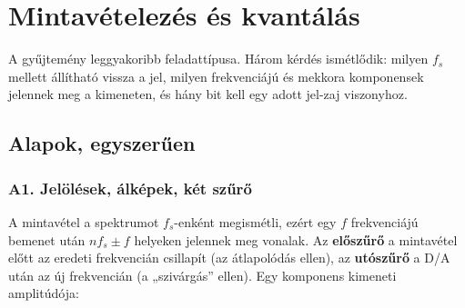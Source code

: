 \setcounter{chapter}{1}
\chapter{\texorpdfstring{Mintavételezés és kvantálás}{Mintavételezés és kvantálás}}\label{f2}
A gyűjtemény leggyakoribb feladattípusa. Három kérdés ismétlődik: milyen $f_s$ mellett állítható vissza a jel, milyen frekvenciájú és mekkora komponensek jelennek meg a kimeneten, és hány bit kell egy adott jel-zaj viszonyhoz.

\section{Alapok, egyszerűen}
\subsection{\texorpdfstring{A1. Jelölések, álképek, két szűrő}{A1. Jelölések, álképek, két szűrő}}\label{a2-tetel}
\par{}\par

A mintavétel a spektrumot $f_s$-enként megismétli, ezért egy $f$ frekvenciájú bemenet után $nf_s\pm f$ helyeken jelennek meg vonalak. Az \textbf{előszűrő} a mintavétel előtt az eredeti frekvencián csillapít (az átlapolódás ellen), az \textbf{utószűrő} a D/A után az új frekvencián (a „szivárgás” ellen). Egy komponens kimeneti amplitúdója:

\begin{center}\end{center}

